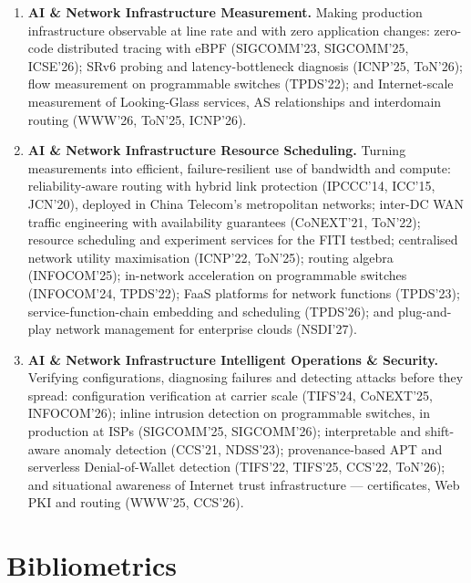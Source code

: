 \documentclass[11pt]{article}
\begin{document}
\begin{enumerate}[leftmargin=1.6em,label=\textbf{\arabic*.}]
  \item \textbf{AI \& Network Infrastructure Measurement.} Making production
  infrastructure observable at line rate and with zero application changes: zero-code
  distributed tracing with eBPF (SIGCOMM'23, SIGCOMM'25, ICSE'26); SRv6 probing and
  latency-bottleneck diagnosis (ICNP'25, ToN'26); flow measurement on programmable
  switches (TPDS'22); and Internet-scale measurement of Looking-Glass services, AS
  relationships and interdomain routing (WWW'26, ToN'25, ICNP'26).
  \item \textbf{AI \& Network Infrastructure Resource Scheduling.} Turning measurements
  into efficient, failure-resilient use of bandwidth and compute: reliability-aware
  routing with hybrid link protection (IPCCC'14, ICC'15, JCN'20), deployed in China
  Telecom's metropolitan networks; inter-DC WAN traffic engineering with availability
  guarantees (CoNEXT'21, ToN'22); resource scheduling and experiment services for the
  FITI testbed; centralised network
  utility maximisation (ICNP'22, ToN'25); routing algebra (INFOCOM'25); in-network
  acceleration on programmable switches (INFOCOM'24, TPDS'22); FaaS platforms for
  network functions (TPDS'23); service-function-chain embedding and scheduling
  (TPDS'26); and plug-and-play network management for enterprise clouds (NSDI'27).
  \item \textbf{AI \& Network Infrastructure Intelligent Operations \& Security.}
  Verifying configurations, diagnosing failures and detecting attacks before they
  spread: configuration verification at carrier scale (TIFS'24, CoNEXT'25, INFOCOM'26);
  inline intrusion detection on programmable switches, in production at ISPs
  (SIGCOMM'25, SIGCOMM'26); interpretable and shift-aware anomaly detection (CCS'21,
  NDSS'23); provenance-based APT and serverless Denial-of-Wallet detection (TIFS'22,
  TIFS'25, CCS'22, ToN'26); and situational awareness of Internet trust infrastructure
  --- certificates, Web PKI and routing (WWW'25, CCS'26).
\end{enumerate}

\section*{Bibliometrics}
\vspace{6pt}
\end{document}
